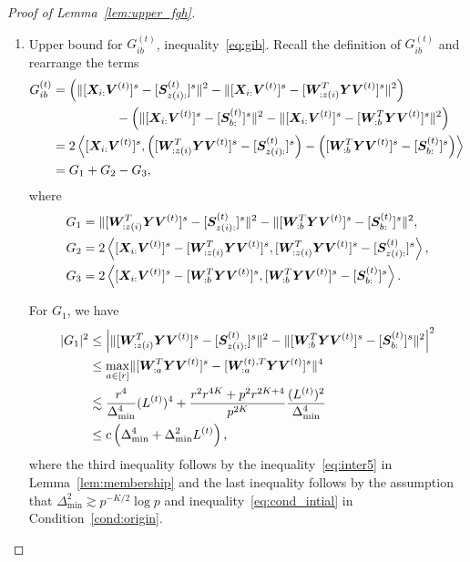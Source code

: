 \documentclass[lettersize,onecolumn,journal]{IEEEtran}
\theoremstyle{definition}
\theoremstyle{definition}
\newcommand{\of}[1]{\left(#1\right)}
\newcommand{\aabs}[1]{\left|#1\right|}
\newcommand{\ang}[1]{\left\langle#1\right\rangle}
\begin{document}
\begin{proof}[Proof of Lemma~\ref{lem:upper_fgh}]
\begin{enumerate}
    \item Upper bound for $G_{ib}^{(t)}$, inequality~\eqref{eq:gib}. Recall the definition of $G_{ib}^{(t)}$ and rearrange the terms
    \begin{align}
        G_{ib}^{(t)} &=   \of{ \onormSize{}{ [\mX_{i:} \mV^{(t)}]^s -  [  \mS_{z(i):}^{(t)}  ]^s}^2 -  \onormSize{}{ [\mX_{i:} \mV^{(t)}]^s -  [  \mW_{:z(i)}^T \mY \mV^{(t)} ]^s}^2}   \\
        & \quad \quad \quad \quad \quad -   \of{ \onormSize{}{ [\mX_{i:} \mV^{(t)}]^s -  [  \mS_{b:}^{(t)}  ]^s}^2 -  \onormSize{}{ [\mX_{i:} \mV^{(t)}]^s -  [  \mW_{:b}^T \mY \mV^{(t)} ]^s}^2 } \\
        &= 2 \ang{  [\mX_{i:} \mV^{(t)}]^s , \of{[  \mW_{:z(i)}^T \mY \mV^{(t)} ]^s -  [  \mS_{z(i):}^{(t)}  ]^s } - \of{ [  \mW_{:b}^T \mY \mV^{(t)} ]^s -  [  \mS_{b:}^{(t)}  ]^s }}\\
        &= G_1 + G_2 - G_3, \label{eq:gib_decomp}
    \end{align}
    where 
    \begin{align}
        G_1 &= \onormSize{}{ [  \mW_{:z(i)}^T \mY \mV^{(t)} ]^s -  [  \mS_{z(i):}^{(t)}  ]^s}^2 - \onormSize{}{ [  \mW_{:b}^T \mY \mV^{(t)} ]^s -  [  \mS_{b:}^{(t)}  ]^s }^2,\\
        G_2 &= 2 \ang{ [\mX_{i:} \mV^{(t)}]^s  -  [  \mW_{:z(i)}^T \mY \mV^{(t)} ]^s,   [  \mW_{:z(i)}^T \mY \mV^{(t)} ]^s -  [  \mS_{z(i):}^{(t)}  ]^s},\\
        G_3 & = 2 \ang{ [\mX_{i:} \mV^{(t)}]^s  -  [  \mW_{:b}^T \mY \mV^{(t)} ]^s,  [  \mW_{:b}^T \mY \mV^{(t)} ]^s -  [  \mS_{b:}^{(t)}  ]^s}.
    \end{align}
    
    For $G_1$, we have 
    \begin{align}
        |G_1|^2 &\leq \aabs{ \onormSize{}{ [ \mW_{:z(i)}^T \mY \mV^{(t)} ]^s - [ \mS_{z(i):}^{(t)}  ]^s}^2 - \onormSize{}{ [ \mW_{:b}^T \mY \mV^{(t)} ]^s -  [ \mS_{b:}^{(t)}  ]^s }^2 }^2 \\
        & \leq \max_{a \in [r]} \onormSize{}{ [ \mW_{:a}^T \mY \mV^{(t)} ]^s - [ \mW_{:a}^{(t),T} \mY \mV^{(t)}  ]^s}^4\\
        & \lesssim \frac{r^4}{\Delta_{\min}^4} (L^{(t)})^4 +  \frac{r^2 r^{4K} + p^2r^{2K+4}}{p^{2K}} \frac{(L^{(t)})^2}{\Delta_{\min}^4} \\
        & \leq c\of{\Delta_{\min}^4 +  \Delta_{\min}^2 L^{(t)}}, \label{eq:g1}
    \end{align}
    where the third inequality follows by the inequality~\eqref{eq:inter5} in Lemma~\ref{lem:membership} and the last inequality follows by the assumption that $\Delta_{\min}^2 \gtrsim p^{-K/2}\log p$ and inequality~\eqref{eq:cond_intial} in Condition~\ref{cond:origin}.
    

\end{enumerate}
\end{proof}
\end{document}
